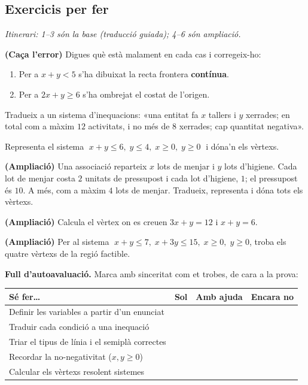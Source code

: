 \subsection{Exercicis per fer}

\noindent\textit{Itinerari: 1–3 són la base (traducció guiada); 4–6 són ampliació.}

\begin{exercicis}
\begin{exlist}
  \item \textbf{(Caça l'error)} Digues què està malament en cada cas i corregeix-ho:
        \begin{enumerate}[label=\alph*), leftmargin=1.6em, topsep=2pt]
          \item Per a $x+y<5$ s'ha dibuixat la recta frontera \textbf{contínua}.
          \item Per a $2x+y\ge 6$ s'ha ombrejat el costat de l'origen.
        \end{enumerate}
  \item Tradueix a un sistema d'inequacions: «una entitat fa $x$ tallers i $y$ xerrades;
        en total com a màxim $12$ activitats, i no més de $8$ xerrades; cap quantitat
        negativa».
  \item Representa el sistema $\;x+y\le 6,\;y\le 4,\;x\ge 0,\;y\ge 0\;$ i dóna'n els
        vèrtexs.
  \item \textbf{(Ampliació)} Una associació reparteix $x$ lots de menjar i $y$ lots
        d'higiene. Cada lot de menjar costa $2$ unitats de pressupost i cada lot
        d'higiene, $1$; el pressupost és $10$. A més, com a màxim $4$ lots de menjar.
        Tradueix, representa i dóna tots els vèrtexs.
  \item \textbf{(Ampliació)} Calcula el vèrtex on es creuen $3x+y=12$ i $x+y=6$.
  \item \textbf{(Ampliació)} Per al sistema $\;x+y\le 7,\;x+3y\le 15,\;x\ge 0,\;y\ge 0$,
        troba els quatre vèrtexs de la regió factible.
\end{exlist}
\end{exercicis}

\begin{idea}
\textbf{Full d'autoavaluació.} Marca amb sinceritat com et trobes, de cara a la prova:
\begin{center}
\renewcommand{\arraystretch}{1.4}
\begin{tabular}{p{8.4cm} c c c}
\toprule
\textbf{Sé fer\dots} & \textbf{Sol} & \textbf{Amb ajuda} & \textbf{Encara no} \\
\midrule
Definir les variables a partir d'un enunciat & & & \\
Traduir cada condició a una inequació & & & \\
Triar el tipus de línia i el semiplà correctes & & & \\
Recordar la no-negativitat ($x,y\ge 0$) & & & \\
Calcular els vèrtexs resolent sistemes & & & \\
\bottomrule
\end{tabular}
\end{center}
\end{idea}

